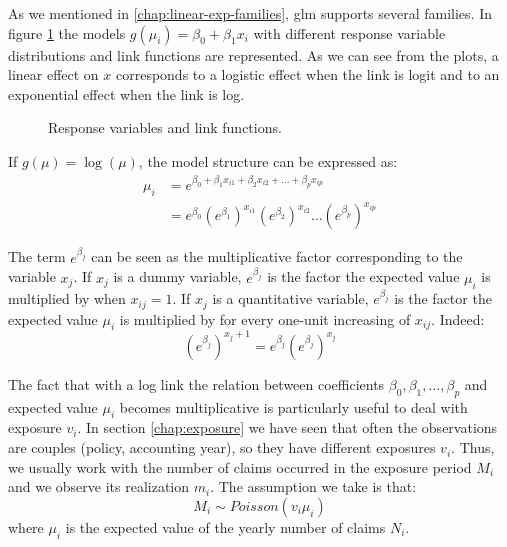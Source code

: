 \documentclass[a4paper, twoside, openright, 12pt]{report}
\theoremstyle{definition}
\theoremstyle{definition}
\theoremstyle{definition}
\theoremstyle{remark}
\begin{document}
As we mentioned in \ref{chap:linear-exp-families}, \ac{glm} supports several families. In figure \ref{fig:resp-var} the models \(g(\mu_i) = \beta_0 + \beta_1 x_i\) with different response variable distributions and link functions are represented. As we can see from the plots, a linear effect on \(x\) corresponds to a logistic effect when the link is logit and to an exponential effect when the link is log.





\begin{figure}[!hbtp]

{\centering {}\newline{}

}

\caption{Response variables and link functions.}\label{fig:resp-var}
\end{figure}

If \(g(\mu) = \log(\mu)\), the model structure can be expressed as:
\begin{align*}
\mu_i & = e^{\beta_0 + \beta_1 x_{i1} + \beta_2 x_{i2} + \dots + \beta_p x_{ip}} \\
& = e^{\beta_0} \left(e^{\beta_1}\right)^{x_{i1}} \left(e^{\beta_2}\right)^{x_{i2}} \dots \left(e^{\beta_p}\right)^{x_{ip}}
\end{align*}

The term \(e^{\beta_j}\) can be seen as the multiplicative factor corresponding to the variable \(x_j\). If \(x_j\) is a dummy variable, \(e^{\beta_j}\) is the factor the expected value \(\mu_i\) is multiplied by when \(x_{ij}=1\). If \(x_j\) is a quantitative variable, \(e^{\beta_j}\) is the factor the expected value \(\mu_i\) is multiplied by for every one-unit increasing of \(x_{ij}\). Indeed:
\[\left(e^{\beta_j}\right)^{x_j+1} = e^{\beta_j} \left(e^{\beta_j}\right)^{x_j}\]

The fact that with a log link the relation between coefficients \(\beta_0, \beta_1, \dots, \beta_p\) and expected value \(\mu_i\) becomes multiplicative is particularly useful to deal with exposure \(v_i\). In section \ref{chap:exposure} we have seen that often the observations are couples (policy, accounting year), so they have different exposures \(v_i\). Thus, we usually work with the number of claims occurred in the exposure period \(M_i\) and we observe its realization \(m_i\). The assumption we take is that:
\[M_i \sim Poisson(v_i \mu_i)\]
where \(\mu_i\) is the expected value of the yearly number of claims \(N_i\).
\end{document}
